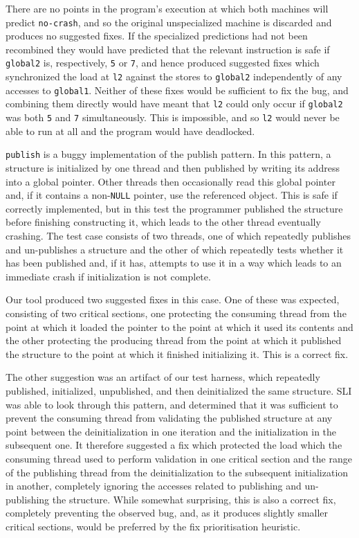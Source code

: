 \documentclass[10pt,twocolumn,preprint,natbib,authoryear]{sigplanconf}
\begin{document}
\noindent
There are no points in the program's execution at which both machines
will predict \verb|no-crash|, and so the original unspecialized
machine is discarded and produces no suggested fixes.  If the
specialized predictions had not been recombined they would have
predicted that the relevant instruction is safe if \verb|global2| is,
respectively, \verb|5| or \verb|7|, and hence produced suggested fixes
which synchronized the load at \verb|l2| against the stores to
\verb|global2| independently of any accesses to \verb|global1|.
Neither of these fixes would be sufficient to fix the bug, and
combining them directly would have meant that \verb|l2| could only
occur if \verb|global2| was both \verb|5| and \verb|7| simultaneously.
This is impossible, and so \verb|l2| would never be able to run at all
and the program would have deadlocked.

\verb|publish| is a buggy implementation of the publish pattern.  In
this pattern, a structure is initialized by one thread and then
published by writing its address into a global pointer.  Other threads
then occasionally read this global pointer and, if it contains a
non-\verb|NULL| pointer, use the referenced object.  This is safe if
correctly implemented, but in this test the programmer published the
structure before finishing constructing it, which leads to the other
thread eventually crashing.  The test case consists of two threads,
one of which repeatedly publishes and un-publishes a structure and the
other of which repeatedly tests whether it has been published and, if
it has, attempts to use it in a way which leads to an immediate crash
if initialization is not complete.

Our tool produced two suggested fixes in this case.  One of these was
expected, consisting of two critical sections, one protecting the
consuming thread from the point at which it loaded the pointer to the
point at which it used its contents and the other protecting the
producing thread from the point at which it published the structure to
the point at which it finished initializing it.  This is a correct
fix.

The other suggestion was an artifact of our test harness, which
repeatedly published, initialized, unpublished, and then deinitialized
the same structure.  SLI was able to look through this pattern, and
determined that it was sufficient to prevent the consuming thread from
validating the published structure at any point between the
deinitialization in one iteration and the initialization in the
subsequent one.  It therefore suggested a fix which protected the load
which the consuming thread used to perform validation in one critical
section and the range of the publishing thread from the
deinitialization to the subsequent initialization in another,
completely ignoring the accesses related to publishing and
un-publishing the structure.  While somewhat surprising, this is also
a correct fix, completely preventing the observed bug, and, as it
produces slightly smaller critical sections, would be preferred by the
fix prioritisation heuristic.
\end{document}
